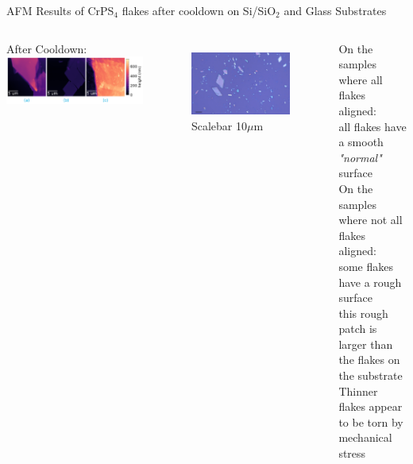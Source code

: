 \documentclass[
	10pt,
]{beamer}
\begin{document}
\begin{frame}{AFM Results of CrPS$_4$ flakes after cooldown on Si/SiO$_2$ and Glass Substrates}
	\begin{columns}
		After Cooldown:\\
		\includegraphics[width=\textwidth]{../figures/2024-02-29 afm.pdf}
		\begin{figure}
			\centering
			\includegraphics[width=.5\textwidth]{../../data/2023-12-04_LO_MG_NiPS3/CrPS4_50x_10um.png}
			\\Scalebar 10$\mu$m
		\end{figure}

		On the samples where all flakes aligned:\\ all flakes have a smooth \textit{"normal"} surface
		\vspace{.5cm}\\
		On the samples where not all flakes aligned:\\ some flakes have a rough surface
		\\ this rough patch is larger than the flakes on the substrate
		\vspace{.5cm}\\
		Thinner flakes appear to be torn by mechanical stress
		\vspace{.5cm}

	\end{columns}
\end{frame}
\end{document}
